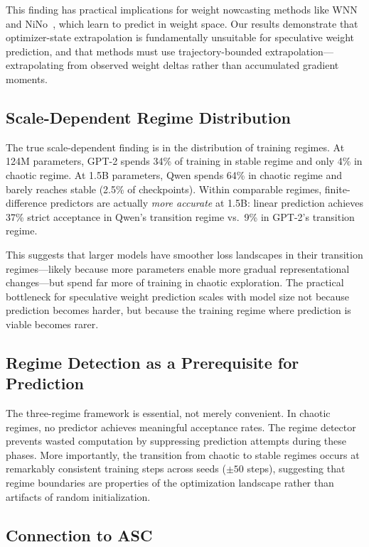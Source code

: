 \documentclass{article}
\begin{document}
This finding has practical implications for weight nowcasting methods like WNN~\citep{jang2023wnn} and NiNo~\citep{knyazev2025nino}, which learn to predict in weight space.
Our results demonstrate that optimizer-state extrapolation is fundamentally unsuitable for speculative weight prediction, and that methods must use trajectory-bounded extrapolation---extrapolating from observed weight deltas rather than accumulated gradient moments.

\subsection{Scale-Dependent Regime Distribution}

The true scale-dependent finding is in the distribution of training regimes.
At 124M parameters, GPT-2 spends 34\% of training in stable regime and only 4\% in chaotic regime.
At 1.5B parameters, Qwen spends 64\% in chaotic regime and barely reaches stable (2.5\% of checkpoints).
Within comparable regimes, finite-difference predictors are actually \emph{more accurate} at 1.5B: linear prediction achieves 37\% strict acceptance in Qwen's transition regime vs.\ 9\% in GPT-2's transition regime.

This suggests that larger models have smoother loss landscapes in their transition regimes---likely because more parameters enable more gradual representational changes---but spend far more of training in chaotic exploration.
The practical bottleneck for speculative weight prediction scales with model size not because prediction becomes harder, but because the training regime where prediction is viable becomes rarer.

\subsection{Regime Detection as a Prerequisite for Prediction}

The three-regime framework is essential, not merely convenient.
In chaotic regimes, no predictor achieves meaningful acceptance rates.
The regime detector prevents wasted computation by suppressing prediction attempts during these phases.
More importantly, the transition from chaotic to stable regimes occurs at remarkably consistent training steps across seeds ($\pm 50$ steps), suggesting that regime boundaries are properties of the optimization landscape rather than artifacts of random initialization.

\subsection{Connection to ASC}
\end{document}
